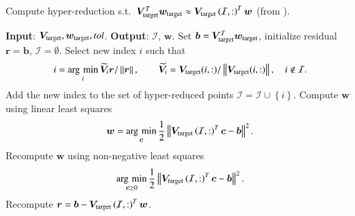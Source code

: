 \documentclass[preprint,10pt]{elsarticle}
\theoremstyle{definition}
\theoremstyle{lemma}
\theoremstyle{theorem}
\theoremstyle{assumption}
\DeclareMathOperator*{\argmin}{\arg\,\min}
\renewcommand{\tilde}{\widetilde}
\newcommand{\nor}[1]{\left\| #1 \right\|}
\newcommand{\LRp}[1]{\left( #1 \right)}
\newcommand{\LRc}[1]{\left\{ #1 \right\}}
\begin{document}
\begin{algorithm}[!h]
\caption{Compute hyper-reduction s.t.\ $\bm{V}_{\rm target}^T\bm{w}_{\rm target} \approx \bm{V}_{\rm target}\LRp{\mathcal{I},:}^T\bm{w}$ (from \cite{hernandez2017dimensional}).}
\begin{algorithmic}[1]
\STATE \textbf{Input}: $\bm{V}_{\rm target}, \bm{w}_{\rm target}, tol$.
\STATE \textbf{Output}: $\mathcal{I}$, $\bm{w}$.
\STATE Set $\bm{b} = \bm{V}_{\rm target}^T\bm{w}_{\rm target}$, initialize residual $\bm{r} = \bm{b}$, $\mathcal{I} = \emptyset$.
\WHILE {$\nor{\bm{r}}/\nor{\bm{b}} > tol$}
        \STATE Select new index $i$ such that
        \[
        i = \argmin_i \tilde{\bm{V}}_{i}\bm{r}/\nor{\bm{r}}, \qquad
        \tilde{\bm{V}}_i = \bm{V}_{\rm target}(i,:) / \nor{\bm{V}_{\rm target}(i,:)}, \quad i \not\in \mathcal{I}.
        \]
        \STATE Add the new index to the set of hyper-reduced points $\mathcal{I} = \mathcal{I} \cup \LRc{i}$.  
        \STATE Compute $\bm{w}$ using linear least squares
        \[
        \bm{w} = \argmin_{\bm{c}} \frac{1}{2}\nor{\bm{V}_{\rm target}\LRp{\mathcal{I},:}^T\bm{c} - \bm{b}}^2.
        \]
                \STATE Recompute $\bm{w}$ using non-negative least squares 
                \[
                \argmin_{\bm{c} \geq 0} \frac{1}{2}\nor{\bm{V}_{\rm target}\LRp{\mathcal{I},:}^T\bm{c} - \bm{b}}^2.
                \]             
        \ENDIF
        \STATE Recompute $\bm{r} = \bm{b} - \bm{V}_{\rm target}\LRp{\mathcal{I},:}^T\bm{w}$.
\ENDWHILE
\end{algorithmic}
\label{alg:hr}
\end{algorithm}
\end{document}
